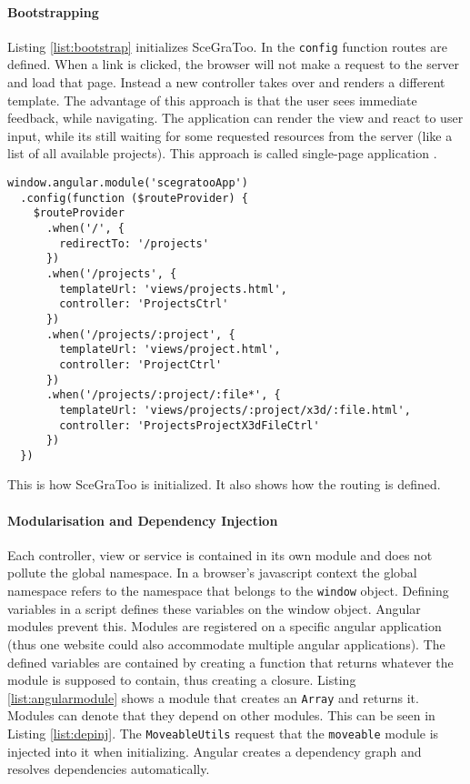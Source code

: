 \paragraph{Bootstrapping}
\label{par:Bootstrapping and Routing}

Listing \ref{list:bootstrap} initializes SceGraToo. In the \texttt{config}
function routes are defined. When a link is clicked, the browser will not make a
request to the server and load that page. Instead a new controller takes over and
renders a different template. The advantage of this approach is that the user
sees immediate feedback, while navigating. The application can render the view and
react to user input, while its still waiting for some requested resources from
the server (like a list of all available projects). This approach is called
single-page application \cite{Mikowski:2013:SPW:2663433}.

\begin{listing}
  \begin{verbatim}
window.angular.module('scegratooApp')
  .config(function ($routeProvider) {
    $routeProvider
      .when('/', {
        redirectTo: '/projects'
      })
      .when('/projects', {
        templateUrl: 'views/projects.html',
        controller: 'ProjectsCtrl'
      })
      .when('/projects/:project', {
        templateUrl: 'views/project.html',
        controller: 'ProjectCtrl'
      })
      .when('/projects/:project/:file*', {
        templateUrl: 'views/projects/:project/x3d/:file.html',
        controller: 'ProjectsProjectX3dFileCtrl'
      })
  })
  \end{verbatim}
  \caption{This is how \gls{SceGraToo} is initialized. It also shows how the routing is defined.}
  \label{list:bootstrap}
\end{listing}

\paragraph{Modularisation and Dependency Injection}
\label{par:modularisation}

Each controller, view or service is contained in its own module and does not
pollute the global namespace. In a browser's javascript context the global
namespace refers to the namespace that belongs to the \texttt{window} object.
Defining variables in a script defines these variables on the window object.
Angular modules prevent this. Modules are registered on a specific angular
application (thus one website could also accommodate multiple angular
applications). The defined variables are contained by creating a function that
returns whatever the module is supposed to contain, thus creating a closure.
Listing \ref{list:angularmodule} shows a module that creates an \texttt{Array} and
returns it. Modules can denote that they depend on other modules. This can be
seen in Listing \ref{list:depinj}. The \texttt{MoveableUtils} request that the
\texttt{moveable} module is injected into it when initializing. Angular creates
a dependency graph and resolves dependencies automatically.


